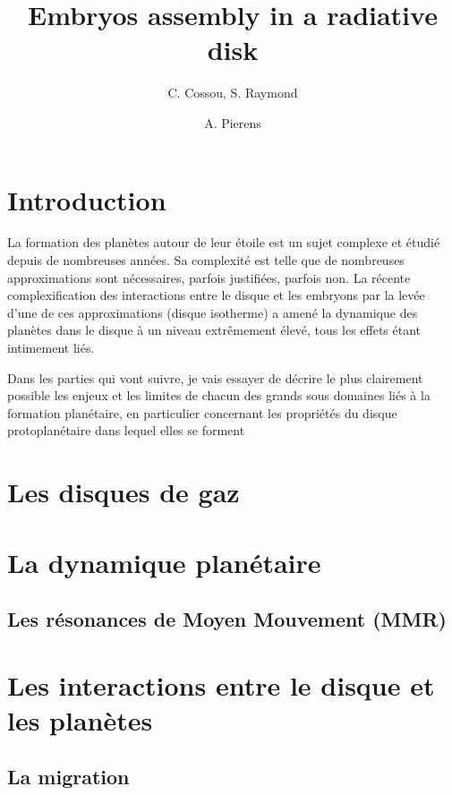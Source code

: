 \documentclass[a4paper,twoside]{article}
\title{Embryos assembly in a radiative disk}
\author{C. Cossou, S. Raymond \and A. Pierens}
\begin{document}
\tableofcontents
\newpage

\section{Introduction}
La formation des planètes autour de leur étoile est un sujet complexe et étudié depuis de nombreuses années. Sa complexité est telle que de nombreuses approximations sont nécessaires, parfois justifiées, parfois non. La récente complexification des interactions entre le disque et les embryons par la levée d'une de ces approximations (disque isotherme) a amené la dynamique des planètes dans le disque à un niveau extrêmement élevé, tous les effets étant intimement liés. 

Dans les parties qui vont suivre, je vais essayer de décrire le plus clairement possible les enjeux et les limites de chacun des grands sous domaines liés à la formation planétaire, en particulier concernant les propriétés du disque protoplanétaire dans lequel elles se forment

\section{Les disques de gaz}


\section{La dynamique planétaire}
\subsection{Les résonances de Moyen Mouvement (MMR)}


\section{Les interactions entre le disque et les planètes}
\subsection{La migration}
\end{document}
